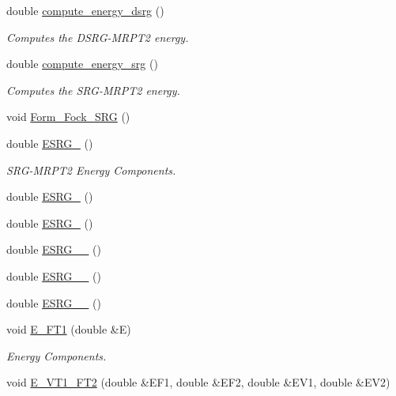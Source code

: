 \begin{DoxyCompactItemize}
double \mbox{\hyperlink{classforte_1_1_m_c_s_r_g_p_t2___m_o_a1501ae80bca18cfb8a189346443efa2e}{compute\+\_\+energy\+\_\+dsrg}} ()
\begin{DoxyCompactList}\small\item\em Computes the D\+S\+R\+G-\/\+M\+R\+P\+T2 energy. \end{DoxyCompactList}\item 
double \mbox{\hyperlink{classforte_1_1_m_c_s_r_g_p_t2___m_o_a320ed94dd45e634913bf226f5885f638}{compute\+\_\+energy\+\_\+srg}} ()
\begin{DoxyCompactList}\small\item\em Computes the S\+R\+G-\/\+M\+R\+P\+T2 energy. \end{DoxyCompactList}\item 
void \mbox{\hyperlink{classforte_1_1_m_c_s_r_g_p_t2___m_o_ae6cb2ec44c6c8c46b34cc27467de49c1}{Form\+\_\+\+Fock\+\_\+\+S\+RG}} ()
\item 
double \mbox{\hyperlink{classforte_1_1_m_c_s_r_g_p_t2___m_o_ae2eb1e7eed16738aac3c013f9773bc0f}{E\+S\+R\+G\+\_}} ()
\begin{DoxyCompactList}\small\item\em S\+R\+G-\/\+M\+R\+P\+T2 Energy Components. \end{DoxyCompactList}\item 
double \mbox{\hyperlink{classforte_1_1_m_c_s_r_g_p_t2___m_o_a10e39753f1094dc48a4086d95541e40f}{E\+S\+R\+G\+\_}} ()
\item 
double \mbox{\hyperlink{classforte_1_1_m_c_s_r_g_p_t2___m_o_ab41baca21b5f575b89aa04a7372d8eb6}{E\+S\+R\+G\+\_}} ()
\item 
double \mbox{\hyperlink{classforte_1_1_m_c_s_r_g_p_t2___m_o_a9b5ad651f6b5ec2c4c56047e24893407}{E\+S\+R\+G\+\_\+\_}} ()
\item 
double \mbox{\hyperlink{classforte_1_1_m_c_s_r_g_p_t2___m_o_aeacf14f3de6588ad89c88853e680af71}{E\+S\+R\+G\+\_\+\_}} ()
\item 
double \mbox{\hyperlink{classforte_1_1_m_c_s_r_g_p_t2___m_o_adcdea03111a41700b182e4d0a6d457bf}{E\+S\+R\+G\+\_\+\_}} ()
\item 
void \mbox{\hyperlink{classforte_1_1_m_c_s_r_g_p_t2___m_o_a73e3ed734c27d6860ea2868ff0edf768}{E\+\_\+\+F\+T1}} (double \&E)
\begin{DoxyCompactList}\small\item\em Energy Components. \end{DoxyCompactList}\item 
void \mbox{\hyperlink{classforte_1_1_m_c_s_r_g_p_t2___m_o_a86058b92bd133506c7b537711b2bee94}{E\+\_\+\+V\+T1\+\_\+\+F\+T2}} (double \&E\+F1, double \&E\+F2, double \&E\+V1, double \&E\+V2)

\end{DoxyCompactItemize}
